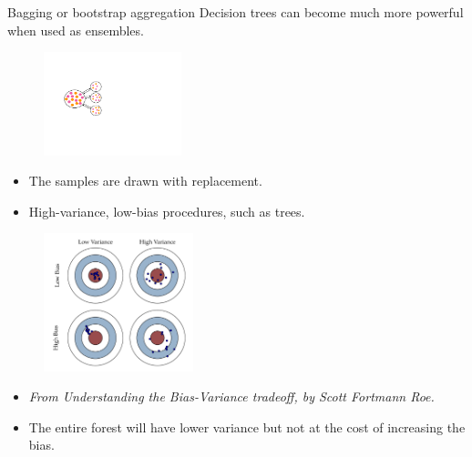 \documentclass[notes]{beamer}          %
\begin{document}
\begin{frame}{Bagging or bootstrap aggregation}
Decision trees can become much more powerful when used as ensembles. \newline
\begin{minipage}{0.5\textwidth}
\begin{figure}
\includegraphics[height=3cm]{figures/week_6/bagging.pdf}  
\end{figure} 
\end{minipage}\hfill
\begin{minipage}{0.5\textwidth}
\begin{itemize}
 \item The samples are drawn with replacement.
 \item High-variance, low-bias procedures, such as trees. 
\end{itemize}
\end{minipage}

\begin{minipage}{0.5\textwidth}
\begin{figure}[H]
\includegraphics[height=4cm]{figures/week_6/Bias-Variance-Tradeoff.png}  
\end{figure} 
\end{minipage}\hfill
\begin{minipage}{0.5\textwidth}
\begin{itemize}
 \item \textit{From Understanding the Bias-Variance tradeoff, by Scott Fortmann Roe.} \newline
 \item The entire forest will have lower variance but not at the cost of increasing the bias.
\end{itemize}
\end{minipage}

\end{frame}
\end{document}

